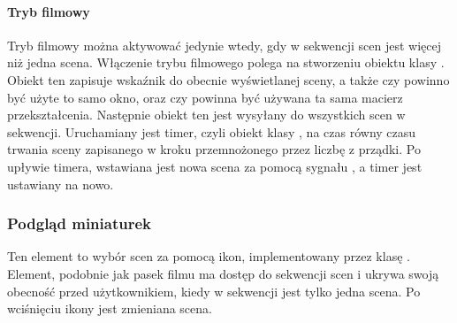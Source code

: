 \paragraph*{Tryb filmowy}

\par
Tryb filmowy można aktywować jedynie wtedy, gdy w sekwencji scen jest więcej niż jedna scena.
Włączenie trybu filmowego polega na stworzeniu obiektu klasy .
Obiekt ten zapisuje wskaźnik do obecnie wyświetlanej sceny, a także czy powinno być użyte to samo okno, oraz czy powinna być używana ta sama macierz przekształcenia.
Następnie obiekt ten jest wysyłany do wszystkich scen w sekwencji.
Uruchamiany jest timer, czyli obiekt klasy , na czas równy czasu trwania sceny zapisanego w kroku przemnożonego przez liczbę z prządki.
Po upływie timera, wstawiana jest nowa scena za pomocą sygnału , a timer jest ustawiany na nowo.

\subsubsection{Podgląd miniaturek}
\label{sec:sokar-framechooser}

Ten element to wybór scen za pomocą ikon, implementowany przez klasę .
Element, podobnie jak pasek filmu ma dostęp do sekwencji scen i ukrywa swoją obecność przed użytkownikiem, kiedy w sekwencji jest tylko jedna scena.
Po wciśnięciu ikony jest zmieniana scena.